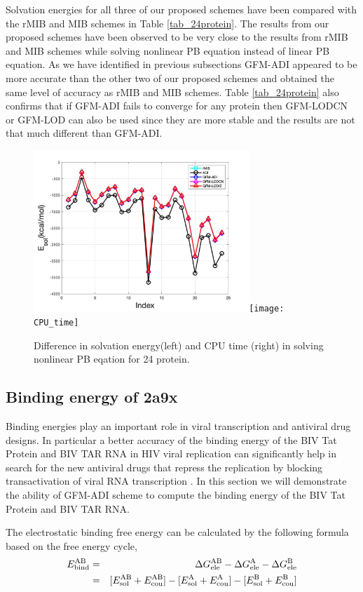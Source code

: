 Solvation energies for all three of our proposed schemes have been compared  with the rMIB and MIB schemes in Table \ref{tab_24protein}. The results from our proposed schemes have been observed to be very close to the results from rMIB and MIB schemes while solving nonlinear PB equation instead of linear PB equation. As we have identified in previous subsections GFM-ADI  appeared to be more accurate than the other two of our proposed schemes and obtained the same level of accuracy as rMIB and MIB schemes. Table \ref{tab_24protein} also confirms that if GFM-ADI fails to converge for any protein then GFM-LODCN or GFM-LOD can also be used since they are more stable and the results are not that much different than GFM-ADI.   
\begin{figure}
	\centering
	\includegraphics[width=3.2in]{24_energy}\texttt{[image: CPU\_time]}
\caption{Difference in solvation energy(left) and CPU time (right) in solving nonlinear PB eqation for 24 protein. }
\end{figure}

\subsection{Binding energy of 2a9x}

Binding energies play an important role in viral transcription and antiviral drug designs. In particular a better accuracy of the binding energy of the BIV Tat Protein and BIV TAR RNA in HIV viral replication can significantly help in search for the new antiviral drugs that repress the replication by blocking transactivation of viral RNA transcription \cite{Leeper2005}. In this section we will demonstrate the ability of GFM-ADI scheme to compute the binding energy of the BIV Tat Protein and BIV TAR RNA. 

The electrostatic binding free energy can be calculated by the following formula based on the free energy cycle,
\begin{eqnarray}
	E^{\rm AB}_{\rm bind}&=&\Delta G^{\rm AB}_{\rm ele}-\Delta G^{\rm A}_{\rm ele}-\Delta G^{\rm B}_{\rm ele}\label{eq_bind}\nonumber \\
	&=& [E^{\rm AB}_{\rm sol}+E^{\rm AB}_{\rm cou}]-[E^{\rm A}_{\rm sol}+E^{\rm A}_{\rm cou}]-[E^{\rm B}_{\rm sol}+E^{\rm B}_{\rm cou}]
\end{eqnarray}
	
